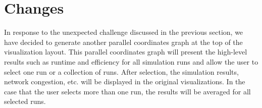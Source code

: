 \documentclass[12pt]{article}
\begin{document}
\section{Changes}
In response to the unexpected challenge discussed in the previous section, we have decided to generate another parallel coordinates graph at the top of the visualization layout. This parallel coordinates graph will present the high-level results such as runtime and efficiency for all simulation runs and allow the user to select one run or a collection of runs. After selection, the simulation results, network congestion, etc. will be displayed in the original visualizations. In the case that the user selects more than one run, the results will be averaged for all selected runs. 






%

%
%


\end{document}
